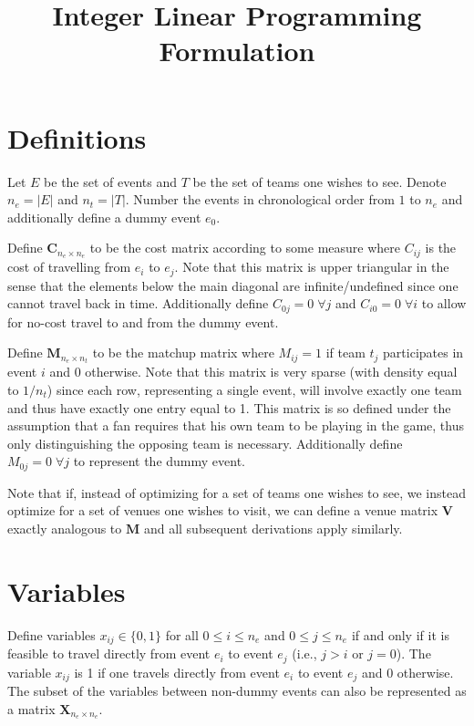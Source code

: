 \documentclass[11pt]{article}
\title{Integer Linear Programming Formulation}
\date{}
\begin{document}
\maketitle

\section{Definitions}
Let $E$ be the set of events and $T$ be the set of teams one wishes to see. Denote $n_e = |E|$ and $n_t = |T|$. Number the events in chronological order from $1$ to $n_e$ and additionally define a dummy event $e_0$.

Define $\mathbf{C}_{n_e \times n_e}$ to be the cost matrix according to some measure where $C_{ij}$ is the cost of travelling from $e_i$ to $e_j$. Note that this matrix is upper triangular in the sense that the elements below the main diagonal are infinite/undefined since one cannot travel back in time. Additionally define $C_{0j} = 0 \; \forall j$ and $C_{i0} = 0 \; \forall i$ to allow for no-cost travel to and from the dummy event.

Define $\mathbf{M}_{n_e \times n_t}$ to be the matchup matrix where $M_{ij} = 1$ if team $t_j$ participates in event $i$ and 0 otherwise. Note that this matrix is very sparse (with density equal to $1/n_t$) since each row, representing a single event, will involve exactly one team and thus have exactly one entry equal to 1. This matrix is so defined under the assumption that a fan requires that his own team to be playing in the game, thus only distinguishing the opposing team is necessary. Additionally define $M_{0j} = 0 \; \forall j$ to represent the dummy event.

Note that if, instead of optimizing for a set of teams one wishes to see, we instead optimize for a set of venues one wishes to visit, we can define a venue matrix $\mathbf{V}$ exactly analogous to $\mathbf{M}$ and all subsequent derivations apply similarly.

\section{Variables}
Define variables $x_{ij} \in \{0, 1\}$ for all $0 \leq i \leq n_e$ and $0 \leq j \leq n_e$ if and only if it is feasible to travel directly from event $e_i$ to event $e_j$ (i.e., $j > i$ or $j = 0$). The variable $x_{ij}$ is 1 if one travels directly from event $e_i$ to event $e_j$ and 0 otherwise. The subset of the variables between non-dummy events can also be represented as a matrix $\mathbf{X}_{n_e \times n_e}$.
\end{document}

